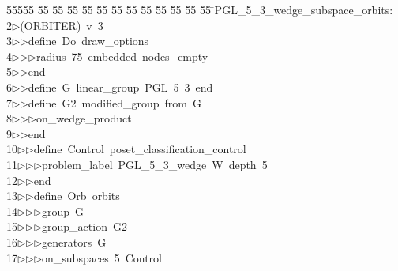 %
%
\begin{tabbing}
55555 \= 55 \= 55 \= 55 \= 55 \= 55 \= 55 \= 55 \= 55 \= 55 \= 55 \= 55 \= 55 \= \>PGL\_5\_3\_wedge\_subspace\_orbits:\\[0pt]
2\>$\triangleright$\>(ORBITER)\ v\ 3\ \\[0pt]
3\>$\triangleright$\>$\triangleright$\>define\ Do\ draw\_options\ \\[0pt]
4\>$\triangleright$\>$\triangleright$\>$\triangleright$\>radius\ 75\ embedded\ nodes\_empty\ \\[0pt]
5\>$\triangleright$\>$\triangleright$\>end\ \\[0pt]
6\>$\triangleright$\>$\triangleright$\>define\ G\ linear\_group\ PGL\ 5\ 3\ end\ \\[0pt]
7\>$\triangleright$\>$\triangleright$\>define\ G2\ modified\_group\ from\ G\ \\[0pt]
8\>$\triangleright$\>$\triangleright$\>$\triangleright$\>on\_wedge\_product\ \\[0pt]
9\>$\triangleright$\>$\triangleright$\>end\ \\[0pt]
10\>$\triangleright$\>$\triangleright$\>define\ Control\ poset\_classification\_control\ \\[0pt]
11\>$\triangleright$\>$\triangleright$\>$\triangleright$\>problem\_label\ PGL\_5\_3\_wedge\ W\ depth\ 5\ \\[0pt]
12\>$\triangleright$\>$\triangleright$\>end\ \\[0pt]
13\>$\triangleright$\>$\triangleright$\>define\ Orb\ orbits\ \\[0pt]
14\>$\triangleright$\>$\triangleright$\>$\triangleright$\>group\ G\ \\[0pt]
15\>$\triangleright$\>$\triangleright$\>$\triangleright$\>group\_action\ G2\ \\[0pt]
16\>$\triangleright$\>$\triangleright$\>$\triangleright$\>generators\ G\ \\[0pt]
17\>$\triangleright$\>$\triangleright$\>$\triangleright$\>on\_subspaces\ 5\ Control\ \\[0pt]

\end{tabbing}
